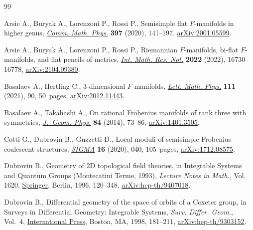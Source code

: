 \begin{thebibliography}{99}
\footnotesize\itemsep=0pt

Arsie A., Buryak A., Lorenzoni P., Rossi P., Semisimple flat {$F$}-manifolds in
 higher genus, \href{https://doi.org/10.1007/s00220-022-04450-6}{\textit{Comm. Math. Phys.}} \textbf{397} (2020), 141--197,
 \href{https://arxiv.org/abs/2001.05599}{arXiv:2001.05599}.

Arsie A., Buryak A., Lorenzoni P., Rossi P., Riemannian {$F$}-manifolds, bi-flat
 {$F$}-manifolds, and flat pencils of metrics, \href{https://doi.org/10.1093/imrn/rnab203}{\textit{Int. Math. Res. Not.}}
 \textbf{2022} (2022), 16730--16778, \href{https://arxiv.org/abs/2104.09380}{arXiv:2104.09380}.

Basalaev A., Hertling C., 3-dimensional {$F$}-manifolds, \href{https://doi.org/10.1007/s11005-021-01432-y}{\textit{Lett. Math.
 Phys.}} \textbf{111} (2021), 90, 50~pages, \href{https://arxiv.org/abs/2012.11443}{arXiv:2012.11443}.

Basalaev A., Takahashi A., On rational {F}robenius manifolds of rank three with
 symmetries, \href{https://doi.org/10.1016/j.geomphys.2014.05.030}{\textit{J.~Geom. Phys.}} \textbf{84} (2014), 73--86,
 \href{https://arxiv.org/abs/1401.3505}{arXiv:1401.3505}.

Cotti G., Dubrovin B., Guzzetti D., Local moduli of semisimple {F}robenius
 coalescent structures, \href{https://doi.org/10.3842/SIGMA.2020.040}{\textit{SIGMA}} \textbf{16} (2020), 040, 105~pages,
 \href{https://arxiv.org/abs/1712.08575}{arXiv:1712.08575}.

Dubrovin B., Geometry of {$2$}{D} topological field theories, in Integrable
 {S}ystems and {Q}uantum {G}roups ({M}ontecatini {T}erme, 1993),
 \textit{Lecture Notes in Math.}, Vol. 1620, \href{https://doi.org/10.1007/BFb0094793}{Springer}, Berlin, 1996, 120--348,
 \href{https://arxiv.org/abs/hep-th/9407018}{arXiv:hep-th/9407018}.

Dubrovin B., Differential geometry of the space of orbits of a {C}oxeter group,
 in Surveys in {D}ifferential {G}eometry: {I}ntegrable {S}ystems,
 \textit{Surv. Differ. Geom.}, Vol.~4, \href{https://doi.org/10.4310/SDG.1998.v4.n1.a4}{International Press}, Boston, MA, 1998,
 181--211, \href{https://arxiv.org/abs/hep-th/9303152}{arXiv:hep-th/9303152}.


\end{thebibliography}
